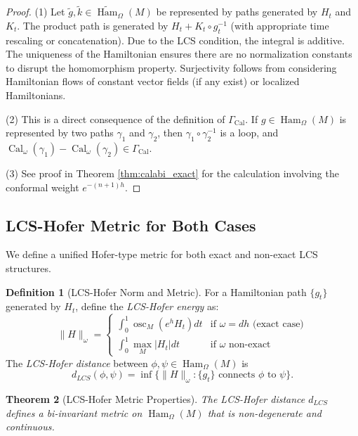 \documentclass[11pt,a4paper]{amsart}
\newtheorem{theorem}{Theorem}[section]
\theoremstyle{definition}
\newtheorem{definition}[theorem]{Definition}
\theoremstyle{remark}
\newcommand{\Ham}{\operatorname{Ham}}
\newcommand{\osc}{\operatorname{osc}}
\newcommand{\Cal}{\operatorname{Cal}}
\begin{document}
	\begin{proof}
		(1) Let $\tilde{g}, \tilde{k} \in \widetilde{\Ham}_\Omega(M)$ be represented by paths generated by $H_t$ and $K_t$. The product path is generated by $H_t + K_t \circ g_t^{-1}$ (with appropriate time rescaling or concatenation). Due to the LCS condition, the integral is additive. The uniqueness of the Hamiltonian ensures there are no normalization constants to disrupt the homomorphism property. Surjectivity follows from considering Hamiltonian flows of constant vector fields (if any exist) or localized Hamiltonians.
		
		(2) This is a direct consequence of the definition of $\Gamma_{\Cal}$. If $g \in \Ham_\Omega(M)$ is represented by two paths $\gamma_1$ and $\gamma_2$, then $\gamma_1 \circ \gamma_2^{-1}$ is a loop, and $\Cal_\omega(\gamma_1) - \Cal_\omega(\gamma_2) \in \Gamma_{\Cal}$.
		
		(3) See proof in Theorem \ref{thm:calabi_exact} for the calculation involving the conformal weight $e^{-(n+1)h}$.
	\end{proof}
	
	\subsection{LCS-Hofer Metric for Both Cases}
	
	We define a unified Hofer-type metric for both exact and non-exact LCS structures.
	
	\begin{definition}[LCS-Hofer Norm and Metric]
		For a Hamiltonian path $\{g_t\}$ generated by $H_t$, define the \emph{LCS-Hofer energy} as:
		\[
		\|H\|_\omega = 
		\begin{cases}
			\int_0^1 \osc_M(e^h H_t) dt & \text{if } \omega = dh \text{ (exact case)} \\
			\int_0^1 \max_M |H_t| dt & \text{if } \omega \text{ non-exact}
		\end{cases}
		\]
		The \emph{LCS-Hofer distance} between $\phi, \psi \in \Ham_\Omega(M)$ is
		\[
		d_{LCS}(\phi, \psi) = \inf \{ \|H\|_\omega : \{g_t\} \text{ connects } \phi \text{ to } \psi \}.
		\]
	\end{definition}
	
	\begin{theorem}[LCS-Hofer Metric Properties] \label{thm:lcs_hofer}
		The LCS-Hofer distance $d_{LCS}$ defines a bi-invariant metric on $\Ham_\Omega(M)$ that is non-degenerate and continuous.
	\end{theorem}
	
\end{document}
